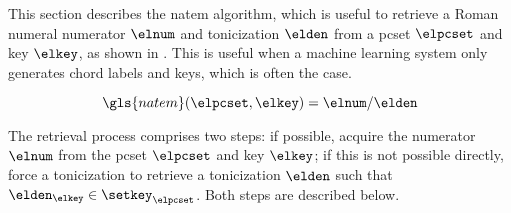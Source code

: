 
This section describes the \gls{natem} algorithm, which is
useful to retrieve a Roman numeral numerator $\elnum$ and
tonicization $\elden$ from a \gls{pcset} $\elpcset$ and key
$\elkey$, as shown in . This is useful when a
machine learning system only generates chord labels and
keys, which is often the case. 

\begin{equation}
    \label{eq:natem}
    \gls{natem}(\elpcset, \elkey) = \elnum\text{/}\elden
\end{equation}

The retrieval process comprises two steps: if possible,
acquire the numerator $\elnum$ from the \gls{pcset}
$\elpcset$ and key $\elkey$; if this is not possible
directly, force a tonicization to retrieve a tonicization
$\elden$ such that $\elden_\elkey \in \setkey_\elpcset$.
Both steps are described below.

